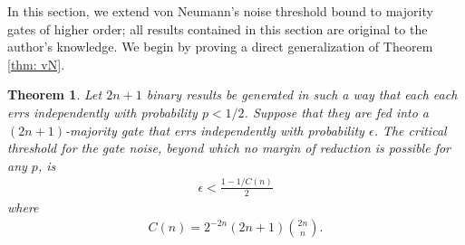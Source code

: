 \documentclass[12pt,reqno]{amsart}
\theoremstyle{plain} %
\newtheorem{theorem}{Theorem}[section]
\theoremstyle{remark}
\theoremstyle{definition}
\begin{document}
In this section, we extend von Neumann's noise threshold bound to majority gates of higher order; all results contained in this section are original to the author's knowledge. We begin by proving a direct generalization of Theorem \ref{thm: vN}.
\begin{theorem}\label{thm: generalvN}
     Let $2n+1$ binary results be generated in such a way that each each errs independently with probability $p<1/2$. Suppose that they are fed into a $(2n+1)$-majority gate that errs independently with probability $\epsilon$. The critical threshold for the gate noise, beyond which no margin of reduction is possible for any $p$, is 
     \begin{align}
         \epsilon<\frac{1-1/C(n)}{2}
     \end{align}
     where 
     \begin{align}
         C(n)=2^{-2n}(2n+1)\binom{2n}{n}.
     \end{align}
\end{theorem}
\end{document}
